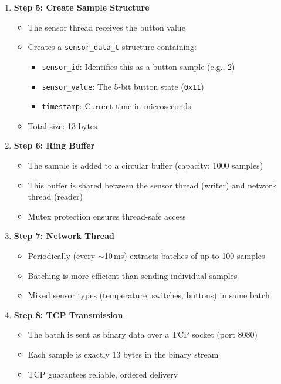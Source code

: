 \begin{enumerate}
    \item \textbf{Step 5: Create Sample Structure}
    \begin{itemize}
        \item The sensor thread receives the button value
        \item Creates a \texttt{sensor\_data\_t} structure containing:
        \begin{itemize}
            \item \texttt{sensor\_id}: Identifies this as a button sample (e.g., 2)
            \item \texttt{sensor\_value}: The 5-bit button state (\texttt{0x11})
            \item \texttt{timestamp}: Current time in microseconds
        \end{itemize}
        \item Total size: 13 bytes
    \end{itemize}

    \item \textbf{Step 6: Ring Buffer}
    \begin{itemize}
        \item The sample is added to a circular buffer (capacity: 1000 samples)
        \item This buffer is shared between the sensor thread (writer) and network thread (reader)
        \item Mutex protection ensures thread-safe access
    \end{itemize}

    \item \textbf{Step 7: Network Thread}
    \begin{itemize}
        \item Periodically (every \(\sim\)10\,ms) extracts batches of up to 100 samples
        \item Batching is more efficient than sending individual samples
        \item Mixed sensor types (temperature, switches, buttons) in same batch
    \end{itemize}

    \item \textbf{Step 8: TCP Transmission}
    \begin{itemize}
        \item The batch is sent as binary data over a TCP socket (port 8080)
        \item Each sample is exactly 13 bytes in the binary stream
        \item TCP guarantees reliable, ordered delivery
    \end{itemize}


\end{enumerate}
